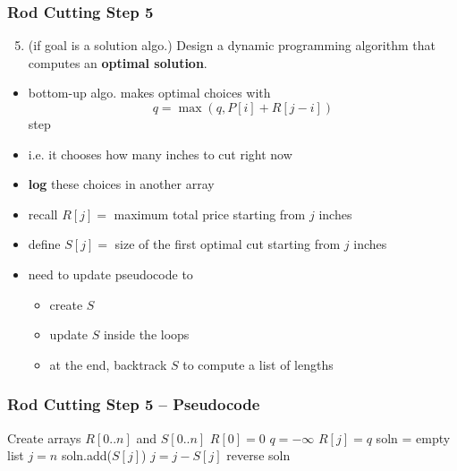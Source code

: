 \documentclass[10pt,aspectratio=169]{beamer}
\begin{document}
\begin{frame} \frametitle{Rod Cutting Step 5}
  \begin{enumerate}
    \setcounter{enumi}{4}
    \item (if goal is a solution algo.) Design a dynamic programming algorithm that computes an \textbf{optimal solution}.
  \end{enumerate}

  \begin{itemize}
    \item bottom-up algo. makes optimal choices with
      \[ q = \max(q, P[i] + R[j-i]) \]
      step
    \item i.e. it chooses how many inches to cut right now
    \item \textbf{log} these choices in another array
    \item recall $R[j] = $ maximum total price starting from $j$ inches
    \item define $S[j] = $ size of the first optimal cut starting from $j$ inches
    \item need to update pseudocode to
    \begin{itemize}
      \item create $S$
      \item update $S$ inside the loops
      \item at the end, backtrack $S$ to compute a list of lengths
    \end{itemize}
  \end{itemize}
\end{frame}

\begin{frame} \frametitle{Rod Cutting Step 5 -- Pseudocode}
  {\tiny
  \begin{algorithmic}[1]
    \State Create arrays $R[0..n]$ and $S[0..n]$
    \State $R[0] = 0$
      \State $q=-\infty$
        \EndIf
      \EndFor
      \State $R[j] = q$
    \EndFor
    \State soln = empty list
    \State $j = n$
      \State soln.add($S[j]$)
      \State $j = j - S[j]$
    \EndWhile
    \State reverse soln
    \State {}
    \EndFunction
  \end{algorithmic}
  }
\end{frame}
\end{document}
